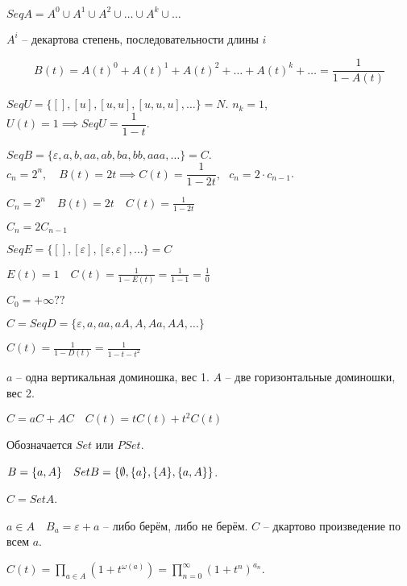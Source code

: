 \begin{definition}
    $Seq A = A^0 \cup A^1 \cup A^2 \cup  \ldots \cup A^k \cup \ldots$

    $A^i$ -- декартова степень, последовательности длины $i$

    \[B(t) = A(t)^0 + A(t)^1 + A(t)^2 + \ldots + A(t)^k + \ldots = \frac{1}{1 - A(t)}\]
\end{definition}

\begin{example}
    $Seq U = \{[], [u], [u,u], [u, u, u], \ldots\} = N$. $n_k = 1$,~~$U(t) = 1 \implies Seq U = \dfrac{1}{1 - t}$.

    $Seq B = \{ \varepsilon, a, b, aa, ab, ba, bb, aaa, \dots \} = C$. $c_n = 2^n,\quad B(t) = 2t \implies C(t) = \dfrac{1}{1 - 2t}, ~~~ c_n = 2 \cdot c_{n - 1}$.

    $C_n = 2^n\quad B(t) = 2t\quad C(t) = \frac{1}{1 - 2t}$

    $C_n = 2C_{n-1}$

    $Seq E = \{[], [\varepsilon], [\varepsilon, \varepsilon], \ldots\} = C$

    $E(t) = 1\quad C(t) = \frac{1}{1 - E(t)} = \frac{1}{1 -1} = \frac{1}{0}\quad$ \frownie{}

    $C_0 = +\infty ??$
\end{example}

\begin{example}
   $C = Seq D = \{\varepsilon, a, aa, aA, A, Aa, AA, \ldots\}$

   $C(t) = \frac{1}{1 - D(t)} = \frac{1}{1 - t - t^2}$

   $a$ -- одна вертикальная доминошка, вес 1. $A$ -- две горизонтальные доминошки, вес 2.

   $C = aC + AC\quad C(t)  = tC(t) + t^2 C(t)$
\end{example}

\begin{definition}
    [Множество]

    Обозначается $Set$ или $PSet$.

    $B = \{a, A\}\quad Set B = \{\emptyset , \{a\}, \{A\}, \{a, A\}\}$.

    $C = Set A$.

    $a\in A\quad B_a = \varepsilon + a$ -- либо берём, либо не берём. $C$ -- дкартово произведение по всем $a$.

    $C(t)  = \prod_{a\in A}\left( 1 + t^{\omega(a)} \right) = \prod_{n = 0}^{\infty } \left( 1 + t^n \right) ^{a_n}$.
\end{definition}

